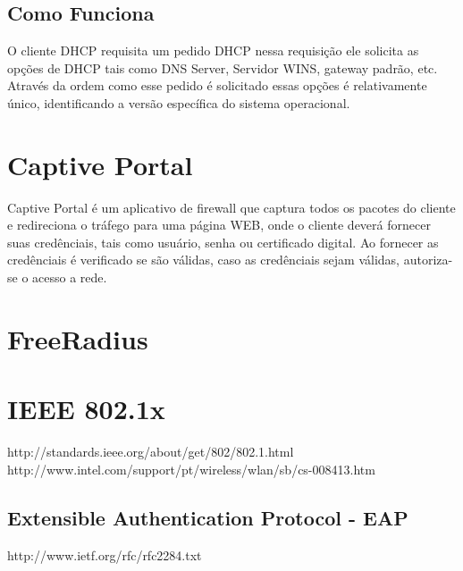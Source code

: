 \documentclass[12pt, brazil, ruledheader, pnumromarab,normaltoc]{abnt}
\begin{document}
\subsection{Como Funciona}
O cliente DHCP requisita um pedido DHCP nessa requisição ele solicita as opções de DHCP tais como DNS Server, Servidor WINS, gateway padrão, etc. Através da ordem como esse pedido é solicitado essas opções é relativamente único, identificando a versão específica do sistema operacional.
\cite{fingerbank}


\section{Captive Portal}\label{sec:captive}
Captive Portal é um aplicativo de firewall que captura todos os pacotes do cliente e redireciona o tráfego para uma página WEB, onde o cliente deverá fornecer suas credênciais, tais como usuário, senha ou certificado digital. Ao fornecer as credênciais é verificado se são válidas, caso as credênciais sejam válidas, autoriza-se o acesso a rede.
\cite{captive}

\section{FreeRadius}\label{sec:radius}

\section{IEEE 802.1x}\label{sec:802.1x}
http://standards.ieee.org/about/get/802/802.1.html
http://www.intel.com/support/pt/wireless/wlan/sb/cs-008413.htm

\subsection{Extensible Authentication Protocol - EAP}
http://www.ietf.org/rfc/rfc2284.txt


\end{document}
